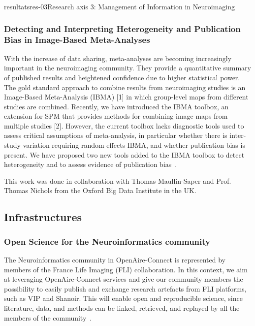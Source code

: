 \documentclass{ra2018}
\begin{document}
\begin{module}{resultats}{res-03}{Research axis 3: Management of Information in Neuroimaging}
\subsubsection{Detecting and Interpreting Heterogeneity and Publication Bias in Image-Based Meta-Analyses}
\begin{participants}
\end{participants}
With the increase of data sharing, meta-analyses are becoming increasingly important in the neuroimaging community. They provide a quantitative summary of published results and heightened confidence due to higher statistical power. The gold standard approach to combine results from neuroimaging studies is an Image-Based Meta-Analysis (IBMA) [1] in which group-level maps from different studies are combined. Recently, we have introduced the IBMA toolbox, an extension for SPM that provides methods for combining image maps from multiple studies [2]. However, the current toolbox lacks diagnostic tools used to assess critical assumptions of meta-analysis, in particular whether there is inter-study variation requiring random-effects IBMA, and whether publication bias is present. We have proposed two new tools added to the IBMA toolbox to detect heterogeneity and to assess evidence of publication bias~\cite{maullinsapey:inserm-01933023}.

This work was done in collaboration with Thomas Maullin-Saper and Prof. Thomas Nichols from the Oxford Big Data Institute in the UK.

\subsection{Infrastructures}
\subsubsection{Open Science for the Neuroinformatics community}
\begin{participants}
\end{participants}
The Neuroinformatics community in OpenAire-Connect is represented by members of the France Life Imaging (FLI) collaboration. In this context, we aim at leveraging OpenAire-Connect services and give our community members the possibility to easily publish and exchange research artefacts from FLI platforms, such as VIP and Shanoir. This will enable open and reproducible science, since literature, data, and methods can be linked, retrieved, and replayed by all the members of the community~\cite{pop:inserm-01846994}.


\end{module}
\end{document}
